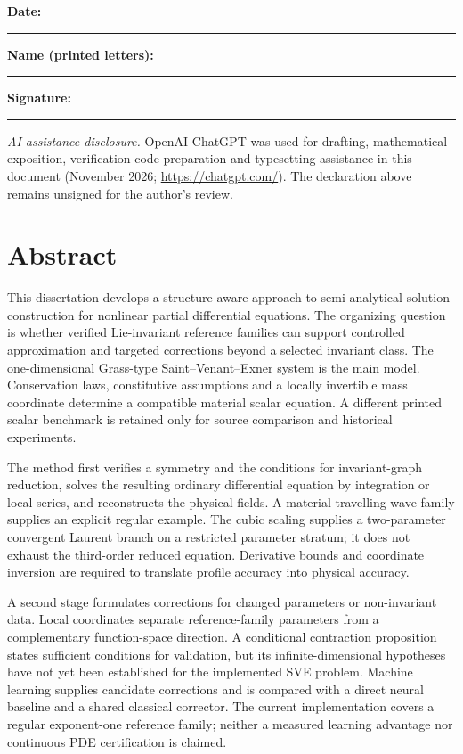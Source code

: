 \documentclass[12pt,a4paper,oneside]{report}
\numberwithin{equation}{chapter}
\theoremstyle{remark}\newtheorem{remark}[theorem]{Remark}
\begin{document}
\vspace{25mm}
\noindent\textbf{Date:} \rule[-8pt]{11.5cm}{0.1em}\par
\bigskip\bigskip
\noindent\textbf{Name (printed letters):} \rule[-8pt]{7.8cm}{0.1em}\par
\bigskip\bigskip
\noindent\textbf{Signature:} \rule[-8pt]{10.55cm}{0.1em}
\vfill
{\small\noindent\textit{AI assistance disclosure.} OpenAI ChatGPT was used for drafting,
mathematical exposition, verification-code preparation and typesetting assistance
in this document (November 2026; \url{https://chatgpt.com/}). The declaration
above remains unsigned for the author's review.}
\clearpage
\chapter*{Abstract}
This dissertation develops a structure-aware approach to semi-analytical solution construction for nonlinear partial differential equations. The organizing question is whether verified Lie-invariant reference families can support controlled approximation and targeted corrections beyond a selected invariant class. The one-dimensional Grass-type Saint--Venant--Exner system is the main model. Conservation laws, constitutive assumptions and a locally invertible mass coordinate determine a compatible material scalar equation. A different printed scalar benchmark is retained only for source comparison and historical experiments.

The method first verifies a symmetry and the conditions for invariant-graph reduction, solves the resulting ordinary differential equation by integration or local series, and reconstructs the physical fields. A material travelling-wave family supplies an explicit regular example. The cubic scaling supplies a two-parameter convergent Laurent branch on a restricted parameter stratum; it does not exhaust the third-order reduced equation. Derivative bounds and coordinate inversion are required to translate profile accuracy into physical accuracy.

A second stage formulates corrections for changed parameters or non-invariant data. Local coordinates separate reference-family parameters from a complementary function-space direction. A conditional contraction proposition states sufficient conditions for validation, but its infinite-dimensional hypotheses have not yet been established for the implemented SVE problem. Machine learning supplies candidate corrections and is compared with a direct neural baseline and a shared classical corrector. The current implementation covers a regular exponent-one reference family; neither a measured learning advantage nor continuous PDE certification is claimed.
\end{document}

